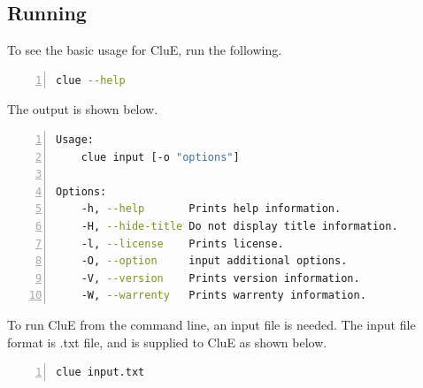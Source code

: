 \documentclass{book}
\begin{document}
\subsection{Running}
To see the basic usage for CluE, run the following.
\begin{lstlisting}[frame=single,numbers=left,language=bash]
clue --help
\end{lstlisting}
The output is shown below.
\begin{lstlisting}[frame=single,numbers=left,language=bash]
Usage:
    clue input [-o "options"]

Options:
    -h, --help       Prints help information.
    -H, --hide-title Do not display title information.
    -l, --license    Prints license.
    -O, --option     input additional options.
    -V, --version    Prints version information.
    -W, --warrenty   Prints warrenty information.
\end{lstlisting}
To run CluE from the command line, an input file is needed.
The input file format is .txt file, and is supplied to CluE as shown below. 
\begin{lstlisting}[frame=single,numbers=left,language=bash]
clue input.txt
\end{lstlisting}
\end{document}
